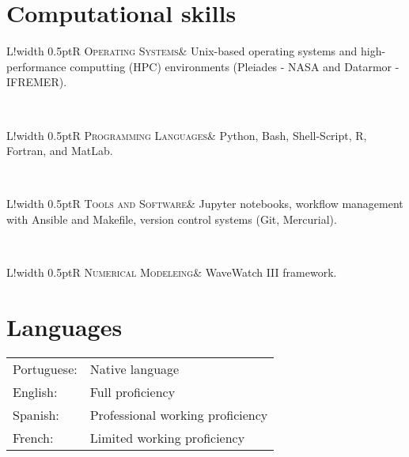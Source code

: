 \documentclass[10pt]{article}
\newcommand\VRule{\color{lightgray}\vrule width 0.5pt}
\begin{document}
\section*{Computational skills}
\vspace{.3cm}
\begin{tabular}{L!{\VRule}R}
\textsc{Operating Systems}& Unix-based 
	operating systems and high-performance computting (HPC) environments (Pleiades - NASA and Datarmor - IFREMER). \\
\end{tabular}
\\[5pt]
\begin{tabular}{L!{\VRule}R}
\textsc{Programming Languages}& Python, Bash, Shell-Script, R, Fortran, and MatLab.
\end{tabular}
\\[5pt]
\begin{tabular}{L!{\VRule}R}
\textsc{Tools and Software}&  Jupyter notebooks, workflow management with Ansible and Makefile, version control systems (Git, Mercurial).
\end{tabular}
\\[5pt]
\begin{tabular}{L!{\VRule}R}
\textsc{Numerical Modeleing}& WaveWatch III framework.
\end{tabular}

\vspace{.5cm}
\section*{Languages}
\vspace{.3cm}
\begin{tabular}{l l}
Portuguese: & Native language\\[3pt]
English:& Full proficiency\\[3pt] 
Spanish: & Professional working proficiency \\[3pt]
French:& Limited working proficiency \\
\end{tabular}
\vspace{.5cm}

\vspace{.3cm}
\end{document}
